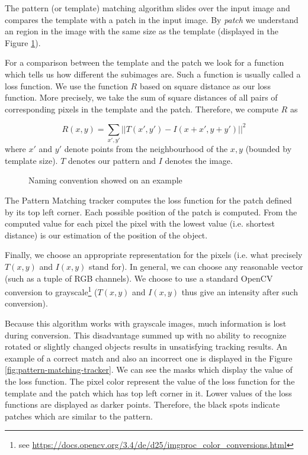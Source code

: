 The pattern (or template) matching algorithm slides over the input image and
compares the template with a patch in the input image. By \emph{patch} we
understand an region in the image with the same size as the template
(displayed in the Figure \ref{fig:patternmatching-naming}).

For a comparison between the template and the patch we look for a function which
tells us how different the subimages are. Such a function is usually called
a loss function. We use the function $R$ based on square distance as our loss
function. More precisely, we take the sum of square distances of all pairs of
corresponding pixels in the template and the patch. Therefore, we compute $R$
as

$$
R(x, y) =
\sum_{x', y'} ||T(x', y') - I(x + x', y + y')||^2
$$
where $x'$ and $y'$ denote points from the neighbourhood of the $x, y$ (bounded by template size).
$T$ denotes our pattern and $I$ denotes the image.

\begin{figure}[h]
	\centering
	\def\svgwidth{0.9\linewidth}
	
	\caption{Naming convention showed on an example}
	\label{fig:patternmatching-naming}
\end{figure}

The Pattern Matching tracker computes the loss function for the patch defined
by its top left corner. Each possible position of the patch is computed.
From the computed value for each pixel the pixel with the lowest value
(i.e. shortest distance) is our estimation of the position of the object.

Finally, we choose an appropriate representation for the pixels (i.e. what
precisely $T(x, y)$ and $I(x, y)$ stand for). In general, we can choose any
reasonable vector (such as a tuple of RGB channels). We choose to use a
standard OpenCV conversion to grayscale\footnote{see \url{https://docs.opencv.org/3.4/de/d25/imgproc\_color\_conversions.html}}
($T(x, y)$ and $I(x, y)$ thus give an intensity after such conversion).

Because this algorithm works with grayscale images, much information is
lost during conversion. This disadvantage summed up with no ability to
recognize rotated or slightly changed objects results in unsatisfying tracking
results. An example of a correct match and also an incorrect one is displayed in the
Figure \ref{fig:pattern-matching-tracker}. We can see the masks which display
the value of the loss function. The pixel color represent the value of the loss
function for the template and the patch which has top left corner in it. Lower
values of the loss functions are displayed as darker points. Therefore, the
black spots indicate patches which are similar to the pattern.

